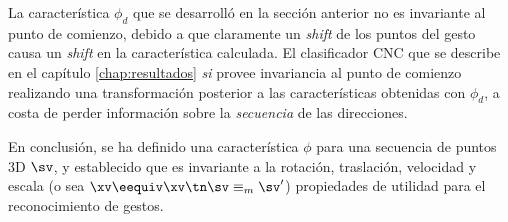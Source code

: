La característica $\phi_d$ que se desarrolló en la sección anterior no es invariante al punto de comienzo, debido a que claramente un \textit{shift} de los puntos del gesto causa un \textit{shift} en la característica calculada. El clasificador CNC que se describe en el  capítulo \ref{chap:resultados} \textit{si} provee invariancia al punto de comienzo realizando una transformación posterior a las características obtenidas con $\phi_d$, a costa de perder información sobre la \textit{secuencia} de las direcciones.

En conclusión, se ha definido una característica $\phi$ para una secuencia de puntos 3D $\sv$, y establecido que es invariante a la rotación, traslación, velocidad y escala (o sea  $ \xv \eequiv \xv \tn \sv \equiv_m \sv'$)  propiedades de utilidad para el reconocimiento de gestos.
